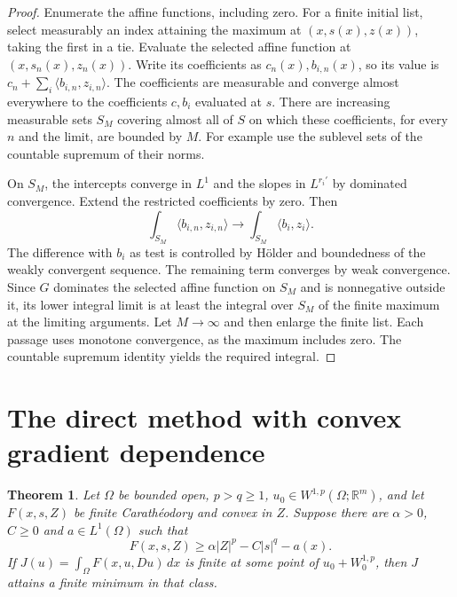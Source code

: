 \documentclass[11pt,oneside,openany]{book}
\newcommand{\R}{\mathbb R}
\theoremstyle{plain}
\newtheorem{theorem}{Theorem}[chapter]
\theoremstyle{definition}
\theoremstyle{remark}
\begin{document}
\begin{proof}
Enumerate the affine functions, including zero. For a finite
initial list, select measurably an index attaining the maximum
at \((x,s(x),z(x))\), taking the first in a tie. Evaluate the
selected affine function at \((x,s_n(x),z_n(x))\). Write its
coefficients as \(c_n(x),b_{i,n}(x)\), so its value is
\(c_n+\sum_i\langle b_{i,n},z_{i,n}\rangle\). The coefficients
are measurable and converge almost everywhere to the
coefficients \(c,b_i\) evaluated at \(s\). There are increasing
measurable sets \(S_M\) covering almost all of \(S\) on which
these coefficients, for every \(n\) and the limit, are bounded
by \(M\). For example use the sublevel sets of the countable
supremum of their norms.

On \(S_M\), the intercepts converge in \(L^1\) and the slopes in
\(L^{r_i'}\) by dominated convergence. Extend the restricted
coefficients by zero. Then
\[
 \int_{S_M}\langle b_{i,n},z_{i,n}\rangle
   \longrightarrow \int_{S_M}\langle b_i,z_i\rangle .
\]
The difference with \(b_i\) as test is controlled by H\"older
and boundedness of the weakly convergent sequence. The remaining
term converges by weak convergence. Since \(G\) dominates the
selected affine function on \(S_M\) and is nonnegative outside
it, its lower integral limit is at least the integral over
\(S_M\) of the finite maximum at the limiting arguments. Let
\(M\to\infty\) and then enlarge the finite list. Each passage
uses monotone convergence, as the maximum includes zero.
The countable supremum identity yields the required integral.
\end{proof}

\section{The direct method with convex gradient dependence}
\label{v08-03}

\begin{theorem}\label{thm:gradient-convex-existence}
Let \(\Omega\) be bounded open, \(p>q\ge1\),
\(u_0\in W^{1,p}(\Omega;\R^m)\), and let \(F(x,s,Z)\) be finite
Carath\'eodory and convex in \(Z\). Suppose there are
\(\alpha>0\), \(C\ge0\) and \(a\in L^1(\Omega)\) such that
\[
 F(x,s,Z)\ge\alpha |Z|^p-C|s|^q-a(x).
\]
If \(J(u)=\int_\Omega F(x,u,Du)\,dx\) is finite at some point of
\(u_0+W^{1,p}_0\), then \(J\) attains a finite minimum in that
class.
\end{theorem}
\end{document}
